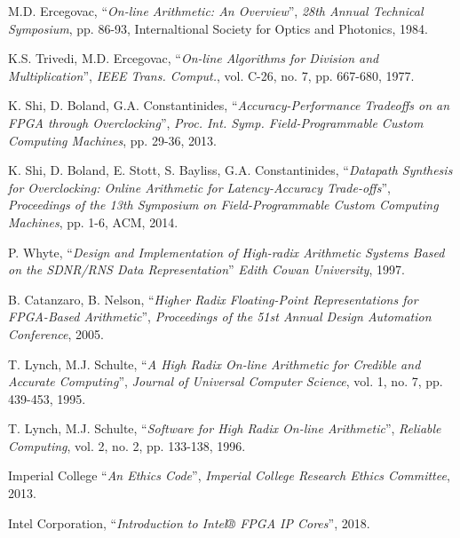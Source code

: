 \documentclass[journal]{IEEEtran}
\begin{document}
\begin{thebibliography}{1}
  M.D. Ercegovac,
  ``\textit{On-line Arithmetic: An Overview}'',
  \textit{28th Annual Technical Symposium}, pp. 86-93,
  Internaltional Society for Optics and Photonics,
  1984.

  K.S. Trivedi, M.D. Ercegovac,
  ``\textit{On-line Algorithms for Division and Multiplication}'',
  \textit{IEEE Trans. Comput.}, vol. C-26, no. 7, pp. 667-680,
  1977.

  K. Shi, D. Boland, G.A. Constantinides,
  ``\textit{Accuracy-Performance Tradeoffs on an FPGA through Overclocking}'',
  \textit{Proc. Int. Symp. Field-Programmable Custom Computing Machines},
  pp. 29-36,
  2013.

  K. Shi, D. Boland, E. Stott, S. Bayliss, G.A. Constantinides,
  ``\textit{Datapath Synthesis for Overclocking: Online Arithmetic for
  Latency-Accuracy Trade-offs}'',
  \textit{Proceedings of the 13th Symposium on Field-Programmable Custom
  Computing Machines},
  pp. 1-6, ACM,
  2014.

  P. Whyte,
  ``\textit{Design and Implementation of High-radix Arithmetic Systems Based
  on the SDNR/RNS Data Representation}''
  \textit{Edith Cowan University},
  1997.

  B. Catanzaro, B. Nelson,
  ``\textit{Higher Radix Floating-Point Representations for FPGA-Based
  Arithmetic}'',
  \textit{Proceedings of the 51st Annual Design Automation Conference},
  2005.

  T. Lynch, M.J. Schulte,
  ``\textit{A High Radix On-line Arithmetic for Credible and Accurate
  Computing}'',
  \textit{Journal of Universal Computer Science}, vol. 1, no. 7, pp. 439-453,
  1995.

  T. Lynch, M.J. Schulte,
  ``\textit{Software for High Radix On-line Arithmetic}'',
  \textit{Reliable Computing}, vol. 2, no. 2, pp. 133-138,
  1996.

  Imperial College
  ``\textit{An Ethics Code}'',
  \textit{Imperial College Research Ethics Committee},
  2013.

  Intel Corporation,
  ``\textit{Introduction to Intel® FPGA IP Cores}'',
  2018.

\end{thebibliography}
\end{document}
